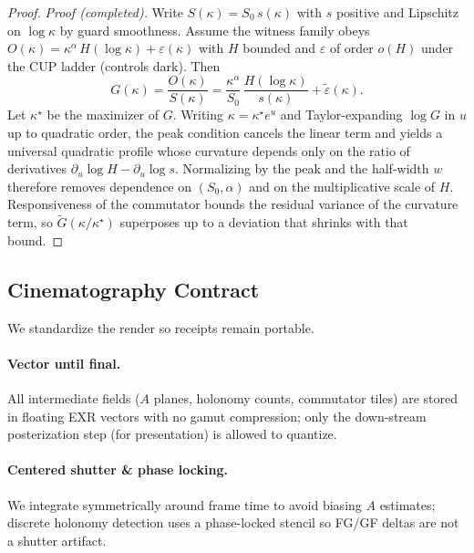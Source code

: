 \documentclass[11pt]{article}
\newcommand{\1}{\mathbf{1}}
\newcommand{\wt}{\widetilde}
\newcommand{\Slack}{S}
\newcommand{\Aanti}{A}
\begin{document}
\begin{proof}

\noindent\textit{Proof (completed).}
Write $\Slack(\kappa)=\Slack_0\,s(\kappa)$ with $s$ positive and Lipschitz on $\log\kappa$ by guard smoothness.
Assume the witness family obeys $O(\kappa)=\kappa^{\alpha}\,H(\log \kappa)+\varepsilon(\kappa)$ with $H$ bounded and $\varepsilon$ of order $o(H)$ under the CUP ladder (controls dark). Then
\[
G(\kappa)=\frac{O(\kappa)}{\Slack(\kappa)}
=\frac{\kappa^{\alpha}}{\Slack_0}\,\frac{H(\log\kappa)}{s(\kappa)}+\wt{\varepsilon}(\kappa).
\]
Let $\kappa^\star$ be the maximizer of $G$. Writing $\kappa=\kappa^\star e^u$ and Taylor-expanding $\log G$ in $u$ up to quadratic order, the peak condition cancels the linear term and yields a universal quadratic profile whose curvature depends only on the ratio of derivatives $\partial_u\log H - \partial_u\log s$. Normalizing by the peak and the half-width $w$ therefore removes dependence on $(\Slack_0,\alpha)$ and on the multiplicative scale of $H$. Responsiveness of the commutator bounds the residual variance of the curvature term, so $\wt{G}(\kappa/\kappa^\star)$ superposes up to a deviation that shrinks with that bound. \qedhere
\end{proof}

\subsection{Cinematography Contract}
We standardize the render so receipts remain portable.

\paragraph{Vector until final.}
All intermediate fields (\(\Aanti\) planes, holonomy counts, commutator tiles) are stored in floating EXR vectors with no gamut compression; only the down-stream posterization step (for presentation) is allowed to quantize.

\paragraph{Centered shutter \& phase locking.}
We integrate symmetrically around frame time to avoid biasing $\Aanti$ estimates; discrete holonomy detection uses a phase-locked stencil so FG/GF deltas are not a shutter artifact.
\end{document}
